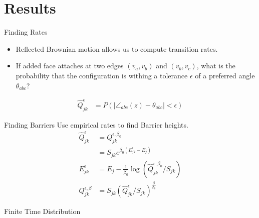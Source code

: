 \documentclass{beamer}
\begin{document}
\section{Results}
\begin{frame}{Finding Rates}
\begin{itemize}
\item Reflected Brownian motion allows us to compute transition rates. 
\item If added face attaches at two edges $(v_a, v_b)$ and $(v_b, v_c)$, what is the probability that the configuration is withing a tolerance $\epsilon$ of a preferred angle $\theta_{abc}$?
\end{itemize}
\begin{align}
\hat{Q}^{\epsilon}_{jk} &= P(|\angle_{abc}(z) - \theta_{abc} | < \epsilon )
\end{align}
\end{frame}
\begin{frame}{Finding Barriers}
Use empirical rates to find Barrier heights. 
\begin{align}
\hat{Q}_{jk}^{\epsilon} &= Q^{\epsilon, \beta_0}_{jk} \\
	&= S_{jk}e^{\beta_0(E_{jk}^{\epsilon} - E_j)} \\
E_{jk}^{\epsilon} &= E_j-\frac{1}{\beta_0}\log\left(\hat{Q}^{\epsilon, \beta_0}_{jk}/S_{jk}\right) \\
Q^{\epsilon, \beta}_{jk} &= S_{jk}\left(\hat{Q}^{\epsilon}_{jk}/S_{jk}\right)^{\frac{\beta}{\beta_0}} 
\end{align}


\end{frame}
\begin{frame}{Finite Time Distribution}
  \centering
\end{frame}
\end{document}
